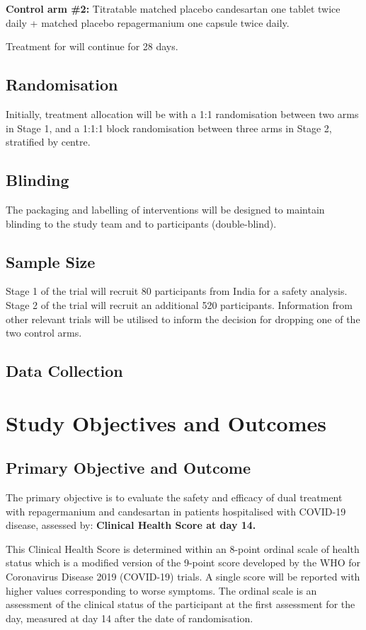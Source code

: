 \documentclass[11pt,parskip=half-]{scrartcl}
\begin{document}
\textbf{Control arm \#2:}  Titratable matched placebo candesartan
one tablet twice daily + matched placebo repagermanium one capsule twice daily.

Treatment for will continue for 28 days.

\subsection{Randomisation}
Initially, treatment allocation will be with a 1:1 randomisation between two arms in Stage 1, and a 1:1:1 block randomisation between three arms in Stage 2, stratified by centre.

\subsection{Blinding}
The packaging and labelling of interventions will be designed to maintain blinding to the study team and to participants (double-blind).

\subsection{Sample Size}
Stage 1 of the trial will recruit 80 participants from India for a safety analysis. Stage 2 of the trial will recruit an additional 520 participants. Information from other relevant trials will be utilised to inform the decision for dropping one of the two control arms.

\subsection{Data Collection}

\clearpage

\section{Study Objectives and Outcomes}

\subsection{Primary Objective and Outcome}
The primary objective is to evaluate the safety and efficacy of dual treatment with repagermanium and candesartan in patients hospitalised with COVID-19 disease, assessed by: \textbf{Clinical Health Score at day 14.}

This Clinical Health Score is determined within an 8-point ordinal scale of health status which is a modified version of the 9-point score developed by the WHO for Coronavirus Disease 2019 (COVID-19) trials. A single score will be reported with higher values corresponding to worse symptoms. The ordinal scale is an assessment of the clinical status of the participant at the first assessment for the day, measured at day 14 after the date of randomisation.
\end{document}
